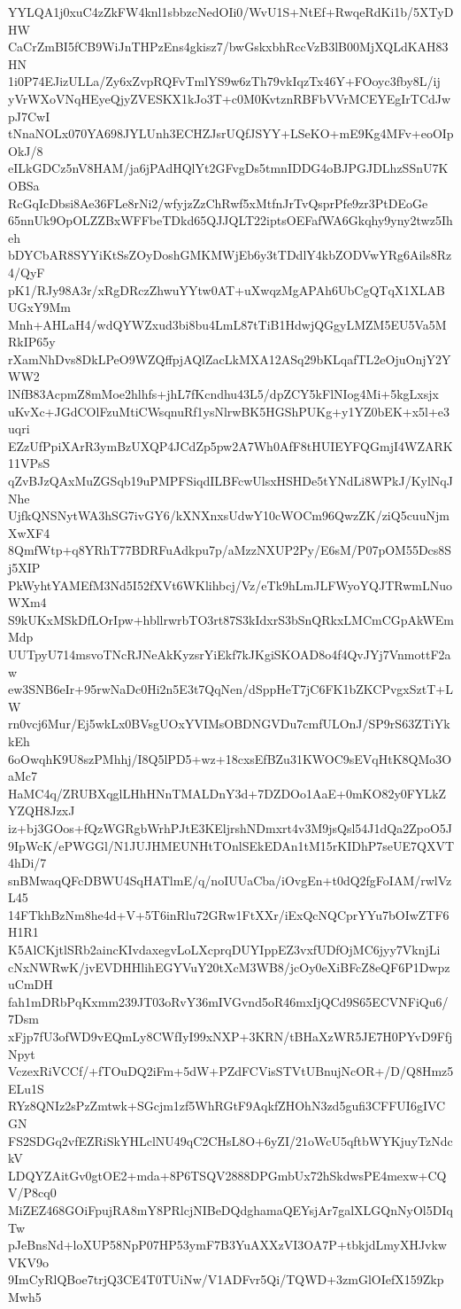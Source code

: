 YYLQA1j0xuC4zZkFW4knl1sbbzcNedOIi0/WvU1S+NtEf+RwqeRdKi1b/5XTyDHW
CaCrZmBI5fCB9WiJnTHPzEns4gkisz7/bwGskxbhRccVzB3lB00MjXQLdKAH83HN
1i0P74EJizULLa/Zy6xZvpRQFvTmlYS9w6zTh79vkIqzTx46Y+FOoyc3fby8L/ij
yVrWXoVNqHEyeQjyZVESKX1kJo3T+c0M0KvtznRBFbVVrMCEYEgIrTCdJwpJ7CwI
tNnaNOLx070YA698JYLUnh3ECHZJsrUQfJSYY+LSeKO+mE9Kg4MFv+eoOIpOkJ/8
eILkGDCz5nV8HAM/ja6jPAdHQlYt2GFvgDs5tmnIDDG4oBJPGJDLhzSSnU7KOBSa
RcGqIcDbsi8Ae36FLe8rNi2/wfyjzZzChRwf5xMtfnJrTvQsprPfe9zr3PtDEoGe
65nnUk9OpOLZZBxWFFbeTDkd65QJJQLT22iptsOEFafWA6Gkqhy9yny2twz5Iheh
bDYCbAR8SYYiKtSsZOyDoshGMKMWjEb6y3tTDdlY4kbZODVwYRg6Ails8Rz4/QyF
pK1/RJy98A3r/xRgDRczZhwuYYtw0AT+uXwqzMgAPAh6UbCgQTqX1XLABUGxY9Mm
Mnh+AHLaH4/wdQYWZxud3bi8bu4LmL87tTiB1HdwjQGgyLMZM5EU5Va5MRkIP65y
rXamNhDvs8DkLPeO9WZQffpjAQlZacLkMXA12ASq29bKLqafTL2eOjuOnjY2YWW2
lNfB83AcpmZ8mMoe2hlhfs+jhL7fKcndhu43L5/dpZCY5kFlNIog4Mi+5kgLxsjx
uKvXc+JGdCOlFzuMtiCWsqnuRf1ysNlrwBK5HGShPUKg+y1YZ0bEK+x5l+e3uqri
EZzUfPpiXArR3ymBzUXQP4JCdZp5pw2A7Wh0AfF8tHUIEYFQGmjI4WZARK11VPsS
qZvBJzQAxMuZGSqb19uPMPFSiqdILBFcwUlsxHSHDe5tYNdLi8WPkJ/KylNqJNhe
UjfkQNSNytWA3hSG7ivGY6/kXNXnxsUdwY10cWOCm96QwzZK/ziQ5cuuNjmXwXF4
8QmfWtp+q8YRhT77BDRFuAdkpu7p/aMzzNXUP2Py/E6sM/P07pOM55Dcs8Sj5XIP
PkWyhtYAMEfM3Nd5I52fXVt6WKlihbcj/Vz/eTk9hLmJLFWyoYQJTRwmLNuoWXm4
S9kUKxMSkDfLOrIpw+hbllrwrbTO3rt87S3kIdxrS3bSnQRkxLMCmCGpAkWEmMdp
UUTpyU714msvoTNcRJNeAkKyzsrYiEkf7kJKgiSKOAD8o4f4QvJYj7VnmottF2aw
ew3SNB6eIr+95rwNaDc0Hi2n5E3t7QqNen/dSppHeT7jC6FK1bZKCPvgxSztT+LW
rn0vcj6Mur/Ej5wkLx0BVsgUOxYVIMsOBDNGVDu7cmfULOnJ/SP9rS63ZTiYkkEh
6oOwqhK9U8szPMhhj/I8Q5lPD5+wz+18cxsEfBZu31KWOC9sEVqHtK8QMo3OaMc7
HaMC4q/ZRUBXqglLHhHNnTMALDnY3d+7DZDOo1AaE+0mKO82y0FYLkZYZQH8JzxJ
iz+bj3GOos+fQzWGRgbWrhPJtE3KEljrshNDmxrt4v3M9jsQsl54J1dQa2ZpoO5J
9IpWcK/ePWGGl/N1JUJHMEUNHtTOnlSEkEDAn1tM15rKIDhP7seUE7QXVT4hDi/7
snBMwaqQFcDBWU4SqHATlmE/q/noIUUaCba/iOvgEn+t0dQ2fgFoIAM/rwlVzL45
14FTkhBzNm8he4d+V+5T6inRlu72GRw1FtXXr/iExQcNQCprYYu7bOIwZTF6H1R1
K5AlCKjtlSRb2aincKIvdaxegvLoLXcprqDUYIppEZ3vxfUDfOjMC6jyy7VknjLi
cNxNWRwK/jvEVDHHlihEGYVuY20tXcM3WB8/jcOy0eXiBFcZ8eQF6P1DwpzuCmDH
fah1mDRbPqKxmm239JT03oRvY36mIVGvnd5oR46mxIjQCd9S65ECVNFiQu6/7Dsm
xFjp7fU3ofWD9vEQmLy8CWfIyI99xNXP+3KRN/tBHaXzWR5JE7H0PYvD9FfjNpyt
VczexRiVCCf/+fTOuDQ2iFm+5dW+PZdFCVisSTVtUBnujNcOR+/D/Q8Hmz5ELu1S
RYz8QNIz2sPzZmtwk+SGcjm1zf5WhRGtF9AqkfZHOhN3zd5gufi3CFFUI6gIVCGN
FS2SDGq2vfEZRiSkYHLclNU49qC2CHsL8O+6yZI/21oWcU5qftbWYKjuyTzNdckV
LDQYZAitGv0gtOE2+mda+8P6TSQV2888DPGmbUx72hSkdwsPE4mexw+CQV/P8cq0
MiZEZ468GOiFpujRA8mY8PRlcjNIBeDQdghamaQEYsjAr7galXLGQnNyOl5DIqTw
pJeBnsNd+loXUP58NpP07HP53ymF7B3YuAXXzVI3OA7P+tbkjdLmyXHJvkwVKV9o
9ImCyRlQBoe7trjQ3CE4T0TUiNw/V1ADFvr5Qi/TQWD+3zmGlOIefX159ZkpMwh5
